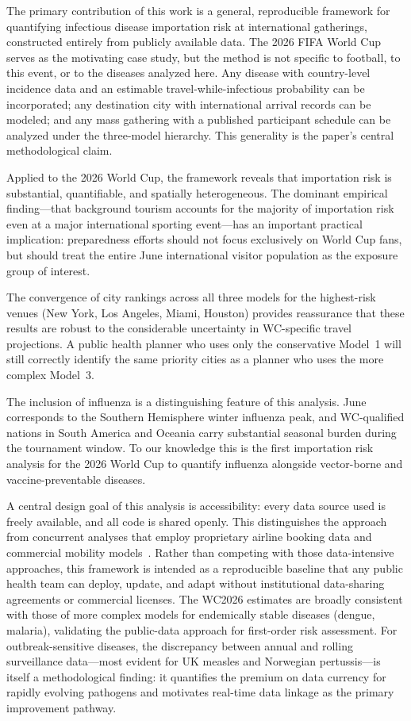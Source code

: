\documentclass[12pt]{article}
\begin{document}
The primary contribution of this work is a general, reproducible
framework for quantifying infectious disease importation risk at
international gatherings, constructed entirely from publicly
available data. The 2026 FIFA World Cup serves as the motivating
case study, but the method is not specific to football, to this
event, or to the diseases analyzed here. Any disease with
country-level incidence data and an estimable travel-while-infectious
probability can be incorporated; any destination city with
international arrival records can be modeled; and any mass gathering
with a published participant schedule can be analyzed under the
three-model hierarchy. This generality is the paper's central
methodological claim.

Applied to the 2026 World Cup, the framework reveals that importation
risk is substantial, quantifiable, and spatially heterogeneous.
The dominant empirical finding---that background tourism accounts
for the majority of importation risk even at a major international
sporting event---has an important practical implication: preparedness
efforts should not focus exclusively on World Cup fans, but should
treat the entire June international visitor population as the
exposure group of interest.

The convergence of city rankings across all three models for the
highest-risk venues (New York, Los Angeles, Miami, Houston) provides
reassurance that these results are robust to the considerable
uncertainty in WC-specific travel projections. A public health planner
who uses only the conservative Model~1 will still correctly identify
the same priority cities as a planner who uses the more complex
Model~3.

The inclusion of influenza is a distinguishing feature of this
analysis. June corresponds to the Southern Hemisphere winter
influenza peak, and WC-qualified nations in South America and Oceania
carry substantial seasonal burden during the tournament window. To
our knowledge this is the first importation risk analysis for the
2026 World Cup to quantify influenza alongside vector-borne and
vaccine-preventable diseases.

A central design goal of this analysis is accessibility: every data
source used is freely available, and all code is shared openly. This
distinguishes the approach from concurrent analyses that employ
proprietary airline booking data and commercial mobility
models~\cite{epistorm2026}. Rather than competing with those
data-intensive approaches, this framework is intended as a
reproducible baseline that any public health team can deploy,
update, and adapt without institutional data-sharing agreements or
commercial licenses. The WC2026 estimates are broadly consistent
with those of more complex models for endemically stable diseases
(dengue, malaria), validating the public-data approach for
first-order risk assessment. For outbreak-sensitive diseases, the
discrepancy between annual and rolling surveillance data---most
evident for UK measles and Norwegian pertussis---is itself a
methodological finding: it quantifies the premium on data currency
for rapidly evolving pathogens and motivates real-time data linkage
as the primary improvement pathway.
\end{document}
